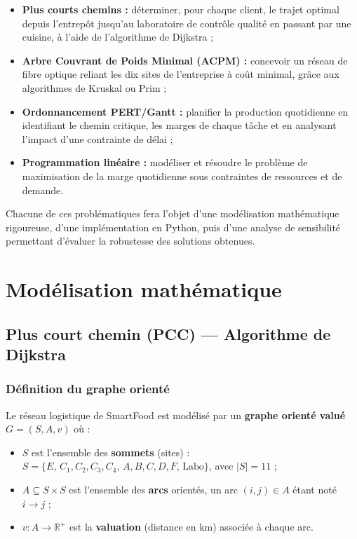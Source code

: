 \documentclass[12pt,a4paper]{article}
\begin{document}
\begin{itemize}
  \item \textbf{Plus courts chemins :} déterminer, pour chaque client, le trajet optimal
        depuis l'entrepôt jusqu'au laboratoire de contrôle qualité en passant par une
        cuisine, à l'aide de l'algorithme de Dijkstra ;
  \item \textbf{Arbre Couvrant de Poids Minimal (ACPM) :} concevoir un réseau de fibre
        optique reliant les dix sites de l'entreprise à coût minimal, grâce aux algorithmes
        de Kruskal ou Prim ;
  \item \textbf{Ordonnancement PERT/Gantt :} planifier la production quotidienne en
        identifiant le chemin critique, les marges de chaque tâche et en analysant
        l'impact d'une contrainte de délai ;
  \item \textbf{Programmation linéaire :} modéliser et résoudre le problème de
        maximisation de la marge quotidienne sous contraintes de ressources et de demande.
\end{itemize}

Chacune de ces problématiques fera l'objet d'une modélisation mathématique rigoureuse,
d'une implémentation en Python, puis d'une analyse de sensibilité permettant d'évaluer
la robustesse des solutions obtenues.

\newpage

\section{Modélisation mathématique}

\subsection{Plus court chemin (PCC) — Algorithme de Dijkstra}

\subsubsection{Définition du graphe orienté}

Le réseau logistique de SmartFood est modélisé par un \textbf{graphe orienté valué}
$G = (S, A, v)$ où :
\begin{itemize}[noitemsep]
  \item $S$ est l'ensemble des \textbf{sommets} (sites) :
        $S = \{E,\, C_1, C_2, C_3, C_4,\, A, B, C, D, F,\, \text{Labo}\}$, avec $|S|=11$ ;
  \item $A \subseteq S \times S$ est l'ensemble des \textbf{arcs} orientés,
        un arc $(i,j) \in A$ étant noté $i \to j$ ;
  \item $v : A \to \mathbb{R}^+$ est la \textbf{valuation} (distance en km) associée à
        chaque arc.
\end{itemize}
\end{document}
